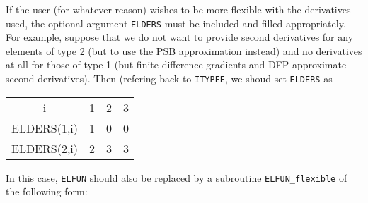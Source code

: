 \documentclass{galahad}
\begin{document}
If the user (for whatever reason) wishes to be more flexible with
the derivatives used, the optional argument {\tt ELDERS} must be
included and filled appropriately. For example, suppose that we do
not want to provide second derivatives for any elements of type 2
(but to use the PSB approximation instead)
and no derivatives at all for those of type 1 (but finite-difference
gradients and DFP approximate second derivatives).
Then (refering back to {\tt ITYPEE}, we shoud set {\tt ELDERS} as
\begin{center}
{\tt \begin{tabular}{cccc}
i        & 1 & 2 & 3 \\
ELDERS(1,i) & 1 & 0 & 0 \\
ELDERS(2,i) & 2 & 3 & 3
\end{tabular}}
\end{center}
In this case, {\tt ELFUN} should also be
replaced by a subroutine {\tt ELFUN\_flexible} of the following form:
\end{document}
